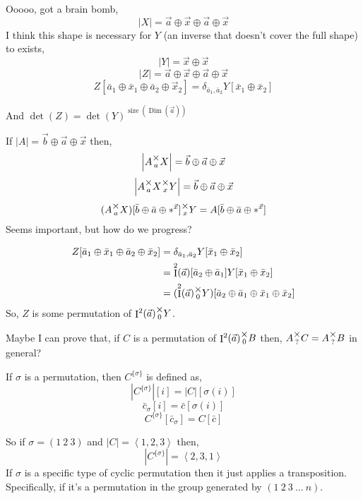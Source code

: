 \documentclass[12pt]{book}
\theoremstyle{plain}
\theoremstyle{definition}
\theoremstyle{ppart}
\theoremstyle{case}
\theoremstyle{solution}
\DeclareMathOperator{\Dim}{Dim}
\DeclareMathOperator{\Ident}{I}
\DeclareMathOperator{\size}{size}
\newcommand{\mmult}[1]{\text{\raisebox{1ex}{$\underset{#1}{\times}$}}}
\newcommand{\shape}[1]{\left|#1\right|}
\newcommand{\transpose}[2]{{#1}^{\{#2\}}}
\begin{document}
\begin{appendices}
\begin{landscape}
Ooooo, got a brain bomb,
\[ |X| = \vec{a} \oplus \vec{x} \oplus \vec{a} \oplus \vec{x} \]
I think this shape is necessary for $Y$ (an inverse that doesn't cover the full shape) to exists,
\[ |Y| = \vec{x} \oplus \vec{x} \]
\[ |Z| = \vec{a} \oplus \vec{x} \oplus \vec{a} \oplus \vec{x} \]
\[ Z[\bar{a}_1 \oplus \bar{x}_1 \oplus \bar{a}_2 \oplus  \vec{x}_2] = \delta_{\bar{a}_1, \bar{a}_2} Y[\bar{x}_1 \oplus \bar{x}_2] \]

And $\det(Z) = \det(Y)^{\size(\Dim(\vec{a}))}$

If $\shape{A} = \vec{b} \oplus \vec{a} \oplus \vec{x}$ then,
\[ \shape{A \mmult{a} X} = \vec{b} \oplus \vec{a} \oplus \vec{x} \]
\[ \shape{A \mmult{a} X \mmult{x} Y} = \vec{b} \oplus \vec{a} \oplus \vec{x} \]
\[ (A \mmult{a} X)[\bar{b} \oplus \bar{a} \oplus *^{\vec{x}}] \mmult{x} Y = A[\bar{b} \oplus \bar{a} \oplus *^{\vec{x}}] \]
Seems important, but how do we progress?

\begin{align*}
  Z[\bar{a}_1 \oplus \bar{x}_1 \oplus \bar{a}_2 \oplus  \bar{x}_2]
  &= \delta_{\bar{a}_1, \bar{a}_2} Y[\bar{x}_1 \oplus \bar{x}_2] \\
  &= \Ident^2(\vec{a})[\bar{a}_2 \oplus \bar{a}_1] Y[\bar{x}_1 \oplus \bar{x}_2] \\
  &= (\Ident^2(\vec{a}) \mmult{0} Y)[\bar{a}_2 \oplus \bar{a}_1 \oplus \bar{x}_1 \oplus \bar{x}_2]
\end{align*}
So, $Z$ is some permutation of $\Ident^2(\vec{a}) \mmult{0} Y$.

Maybe I can prove that, if $C$ is a permutation of $\Ident^2(\vec{a}) \mmult{0} B$ then, $A \mmult{?} C = A \mmult{?} B$ in general?

If $\sigma$ is a permutation, then $\transpose{C}{\sigma}$ is defined as,
\[ \shape{\transpose{C}{\sigma}}[i] = \shape{C}[\sigma(i)] \]
\[ \bar{c}_\sigma[i] = \bar{c}[\sigma(i)] \]
\[ \transpose{C}{\sigma}[\bar{c}_\sigma] = C[\bar{c}] \]

So if $\sigma = (1 ~ 2 ~ 3)$ and $\shape{C} = \left<1,2,3\right>$ then,
\[ \shape{\transpose{C}{\sigma}} = \left<2, 3, 1\right> \]
If $\sigma$ is a specific type of cyclic permutation then it just applies a transposition.
Specifically, if it's a permutation in the group generated by $(1 ~ 2 ~ 3 ~ \ldots ~ n)$.


\end{landscape}
\end{appendices}
\end{document}
